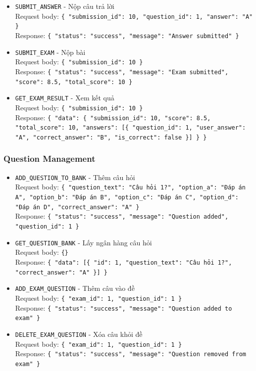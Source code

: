\documentclass[12pt,a4paper]{report}
\newcommand{\json}[1]{\texttt{\allowbreak#1\allowbreak}}
\begin{document}
\begin{itemize}
    Response: \json{\{ "data": \{ "exam\_id": 1, "questions": [\{ "id": 1, "question\_text": "Câu hỏi 1", "options": ["A", "B", "C", "D"] \}] \} \}}
    \item \texttt{SUBMIT\_ANSWER} - Nộp câu trả lời \\
    Request body: \json{\{ "submission\_id": 10, "question\_id": 1, "answer": "A" \}} \\
    Response: \json{\{ "status": "success", "message": "Answer submitted" \}}
    \item \texttt{SUBMIT\_EXAM} - Nộp bài \\
    Request body: \json{\{ "submission\_id": 10 \}} \\
    Response: \json{\{ "status": "success", "message": "Exam submitted", "score": 8.5, "total\_score": 10 \}}
    \item \texttt{GET\_EXAM\_RESULT} - Xem kết quả \\
    Request body: \json{\{ "submission\_id": 10 \}} \\
    Response: \json{\{ "data": \{ "submission\_id": 10, "score": 8.5, "total\_score": 10, "answers": [\{ "question\_id": 1, "user\_answer": "A", "correct\_answer": "B", "is\_correct": false \}] \} \}}
\end{itemize}

\subsubsection{Question Management}
\begin{itemize}
    \item \texttt{ADD\_QUESTION\_TO\_BANK} - Thêm câu hỏi \\
    Request body: \json{\{ "question\_text": "Câu hỏi 1?", "option\_a": "Đáp án A", "option\_b": "Đáp án B", "option\_c": "Đáp án C", "option\_d": "Đáp án D", "correct\_answer": "A" \}} \\
    Response: \json{\{ "status": "success", "message": "Question added", "question\_id": 1 \}}
    \item \texttt{GET\_QUESTION\_BANK} - Lấy ngân hàng câu hỏi \\
    Request body: \json{\{\}} \\
    Response: \json{\{ "data": [\{ "id": 1, "question\_text": "Câu hỏi 1?", "correct\_answer": "A" \}] \}}
    \item \texttt{ADD\_EXAM\_QUESTION} - Thêm câu vào đề \\
    Request body: \json{\{ "exam\_id": 1, "question\_id": 1 \}} \\
    Response: \json{\{ "status": "success", "message": "Question added to exam" \}}
    \item \texttt{DELETE\_EXAM\_QUESTION} - Xóa câu khỏi đề \\
    Request body: \json{\{ "exam\_id": 1, "question\_id": 1 \}} \\
    Response: \json{\{ "status": "success", "message": "Question removed from exam" \}}
\end{itemize}
\end{document}
